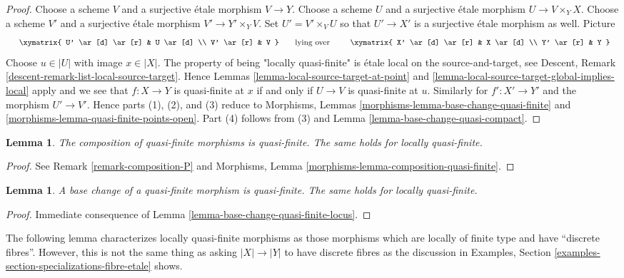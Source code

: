 \documentclass{stacks-project}
\theoremstyle{plain}
\newtheorem{lemma}[subsection]{Lemma}
\theoremstyle{definition}
\theoremstyle{remark}
\numberwithin{equation}{subsection}
\begin{document}
\begin{proof}
Choose a scheme $V$ and a surjective \'etale morphism $V \to Y$.
Choose a scheme $U$ and a surjective \'etale morphism $U \to V \times_Y X$.
Choose a scheme $V'$ and a surjective \'etale morphism $V' \to Y' \times_Y V$.
Set $U' = V' \times_V U$ so that $U' \to X'$ is a surjective \'etale
morphism as well. Picture
$$
\vcenter{
\xymatrix{
U' \ar[d] \ar[r] & U \ar[d] \\
V' \ar[r] & V
}
}
\quad\text{lying over}\quad
\vcenter{
\xymatrix{
X' \ar[d] \ar[r] & X \ar[d] \\
Y' \ar[r] & Y
}
}
$$
Choose $u \in |U|$ with image $x \in |X|$.
The property of being "locally quasi-finite" is \'etale local on
the source-and-target, see
Descent, Remark \ref{descent-remark-list-local-source-target}.
Hence Lemmas \ref{lemma-local-source-target-at-point} and
\ref{lemma-local-source-target-global-implies-local} apply and
we see that $f : X \to Y$ is quasi-finite at $x$
if and only if $U \to V$ is quasi-finite at $u$.
Similarly for $f' : X' \to Y'$ and the morphism $U' \to V'$.
Hence parts (1), (2), and (3) reduce to
Morphisms, Lemmas \ref{morphisms-lemma-base-change-quasi-finite} and
\ref{morphisms-lemma-quasi-finite-points-open}.
Part (4) follows from (3) and Lemma \ref{lemma-base-change-quasi-compact}.
\end{proof}

\begin{lemma}
\label{lemma-composition-quasi-finite}
The composition of quasi-finite morphisms is quasi-finite.
The same holds for locally quasi-finite.
\end{lemma}

\begin{proof}
See Remark \ref{remark-composition-P} and
Morphisms, Lemma \ref{morphisms-lemma-composition-quasi-finite}.
\end{proof}

\begin{lemma}
\label{lemma-base-change-quasi-finite}
A base change of a quasi-finite morphism is quasi-finite.
The same holds for locally quasi-finite.
\end{lemma}

\begin{proof}
Immediate consequence of Lemma \ref{lemma-base-change-quasi-finite-locus}.
\end{proof}

\noindent
The following lemma characterizes locally quasi-finite morphisms as those
morphisms which are locally of finite type and have ``discrete fibres''.
However, this is not the same thing as asking $|X| \to |Y|$ to have
discrete fibres as the discussion in
Examples, Section \ref{examples-section-specializations-fibre-etale}
shows.
\end{document}
